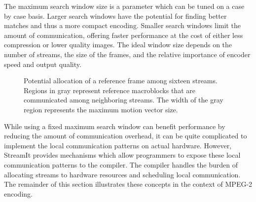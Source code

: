 The maximum search window size is a parameter which can be tuned on a
case by case basis.  Larger search windows have the potential for
finding better matches and thus a more compact encoding.  Smaller
search windows limit the amount of communication, offering faster
performance at the cost of either less compression or lower quality
images.  The ideal window size depends on the number of streams, the
size of the frames, and the relative importance of encoder speed and
output quality.

\begin{figure}[htbp]
\centerline{}
\caption{Potential allocation of a reference frame among sixteen
streams.  Regions in gray represent reference macroblocks that are
communicated among neighboring streams.  The width of the gray
region represents the maximum motion vector size.}
\label{fig:mb_alloc}
\end{figure}

While using a fixed maximum search window can benefit performance by
reducing the amount of communication overhead, it can be quite
complicated to implement the local communication patterns on actual
hardware.  However, StreamIt provides mechanisms which allow
programmers to expose these local communication patterns to the
compiler.  The compiler handles the burden of allocating streams to
hardware resources and scheduling local communication. The remainder
of this section illustrates these concepts in the context of MPEG-2
encoding.
